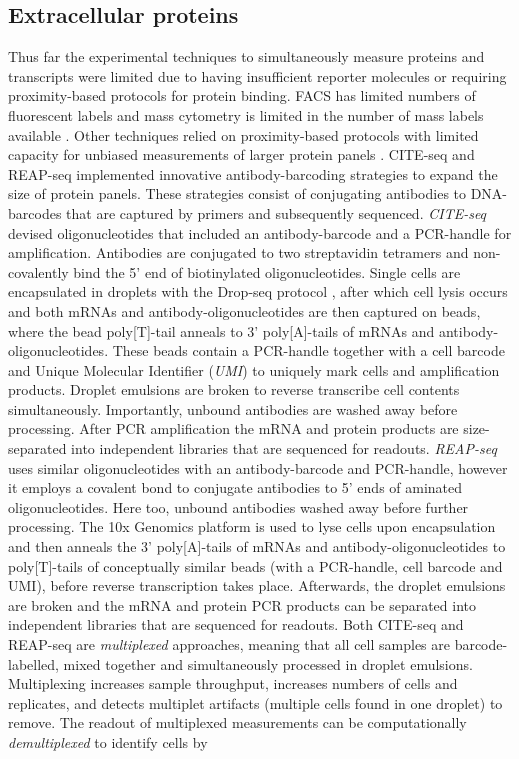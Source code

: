 \documentclass[times, twoside, watermark]{zHenriquesLab-StyleBioRxiv}
\begin{document}
\subsection*{Extracellular proteins} Thus far the experimental techniques to simultaneously measure proteins and transcripts were limited due to having insufficient reporter molecules or requiring proximity-based protocols for protein binding. FACS has limited numbers of fluorescent labels and mass cytometry is limited in the number of mass labels available \cite{Stoeckius2017}. Other techniques relied on proximity-based protocols with limited capacity for unbiased measurements of larger protein panels \cite{Darmanis2016,Genshaft2016,Albayrak2016}. CITE-seq \cite{Stoeckius2017} and REAP-seq \cite{Peterson2017} implemented innovative antibody-barcoding strategies to expand the size of protein panels. These strategies consist of conjugating antibodies to DNA-barcodes that are captured by primers and subsequently sequenced. \newline \textit{CITE-seq} devised oligonucleotides that included an antibody-barcode and a PCR-handle for amplification. Antibodies are conjugated to two streptavidin tetramers and non-covalently bind the 5’ end of biotinylated oligonucleotides. Single cells are encapsulated in droplets with the Drop-seq protocol \cite{Macosko2015}, after which cell lysis occurs and both mRNAs and antibody-oligonucleotides are then captured on beads, where the bead poly[T]-tail anneals to 3’ poly[A]-tails of mRNAs and antibody-oligonucleotides. These beads contain a PCR-handle together with a cell barcode and Unique Molecular Identifier (\textit{UMI}) to uniquely mark cells and amplification products. Droplet emulsions are broken to reverse transcribe cell contents simultaneously. Importantly, unbound antibodies are washed away before processing. After PCR amplification the mRNA and protein products are size-separated into independent libraries that are sequenced for readouts. \newline \textit{REAP-seq} uses similar oligonucleotides with an antibody-barcode and PCR-handle, however it employs a covalent bond to conjugate antibodies to 5’ ends of aminated oligonucleotides. Here too, unbound antibodies washed away before further processing. The 10x Genomics platform \cite{Villani2017} is used to lyse cells upon encapsulation and then anneals the 3’ poly[A]-tails of mRNAs and antibody-oligonucleotides to poly[T]-tails of conceptually similar beads (with a PCR-handle, cell barcode and UMI), before reverse transcription takes place. Afterwards, the droplet emulsions are broken and the mRNA and protein PCR products can be separated into independent libraries that are sequenced for readouts. \newline Both CITE-seq and REAP-seq are \textit{multiplexed} approaches, meaning that all cell samples are barcode-labelled, mixed together and simultaneously processed in droplet emulsions. Multiplexing increases sample throughput, increases numbers of cells and replicates, and detects multiplet artifacts (multiple cells found in one droplet) to remove. The readout of multiplexed measurements can be computationally \textit{demultiplexed} to identify cells by 
\end{document}

